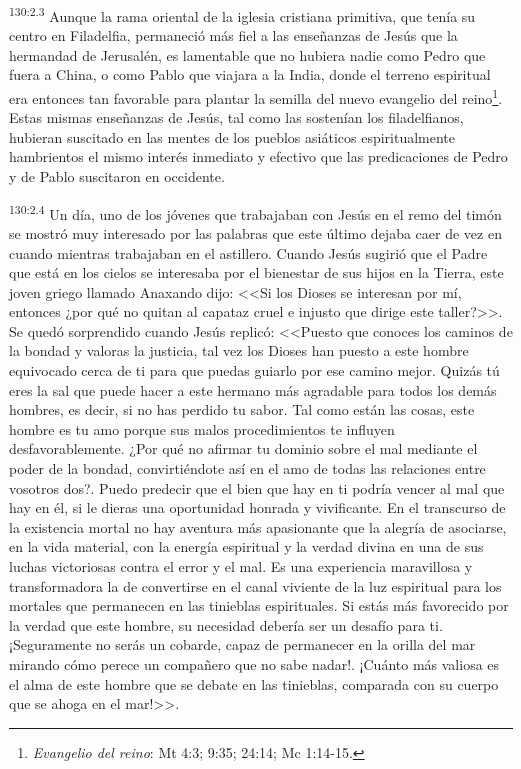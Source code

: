 \par 
\textsuperscript{130:2.3} Aunque la rama oriental de la iglesia cristiana primitiva, que tenía su centro en Filadelfia, permaneció más fiel a las enseñanzas de Jesús que la hermandad de Jerusalén, es lamentable que no hubiera nadie como Pedro que fuera a China, o como Pablo que viajara a la India, donde el terreno espiritual era entonces tan favorable para plantar la semilla del nuevo evangelio del reino\footnote{\textit{Evangelio del reino}: Mt 4:3; 9:35; 24:14; Mc 1:14-15.}. Estas mismas enseñanzas de Jesús, tal como las sostenían los filadelfianos, hubieran suscitado en las mentes de los pueblos asiáticos espiritualmente hambrientos el mismo interés inmediato y efectivo que las predicaciones de Pedro y de Pablo suscitaron en occidente.

\par 
\textsuperscript{130:2.4} Un día, uno de los jóvenes que trabajaban con Jesús en el remo del timón se mostró muy interesado por las palabras que este último dejaba caer de vez en cuando mientras trabajaban en el astillero. Cuando Jesús sugirió que el Padre que está en los cielos se interesaba por el bienestar de sus hijos en la Tierra, este joven griego llamado Anaxando dijo: <<Si los Dioses se interesan por mí, entonces ¿por qué no quitan al capataz cruel e injusto que dirige este taller?>>. Se quedó sorprendido cuando Jesús replicó: <<Puesto que conoces los caminos de la bondad y valoras la justicia, tal vez los Dioses han puesto a este hombre equivocado cerca de ti para que puedas guiarlo por ese camino mejor. Quizás tú eres la sal que puede hacer a este hermano más agradable para todos los demás hombres, es decir, si no has perdido tu sabor. Tal como están las cosas, este hombre es tu amo porque sus malos procedimientos te influyen desfavorablemente. ¿Por qué no afirmar tu dominio sobre el mal mediante el poder de la bondad, convirtiéndote así en el amo de todas las relaciones entre vosotros dos?. Puedo predecir que el bien que hay en ti podría vencer al mal que hay en él, si le dieras una oportunidad honrada y vivificante. En el transcurso de la existencia mortal no hay aventura más apasionante que la alegría de asociarse, en la vida material, con la energía espiritual y la verdad divina en una de sus luchas victoriosas contra el error y el mal. Es una experiencia maravillosa y transformadora la de convertirse en el canal viviente de la luz espiritual para los mortales que permanecen en las tinieblas espirituales. Si estás más favorecido por la verdad que este hombre, su necesidad debería ser un desafío para ti. ¡Seguramente no serás un cobarde, capaz de permanecer en la orilla del mar mirando cómo perece un compañero que no sabe nadar!. ¡Cuánto más valiosa es el alma de este hombre que se debate en las tinieblas, comparada con su cuerpo que se ahoga en el mar!>>.

